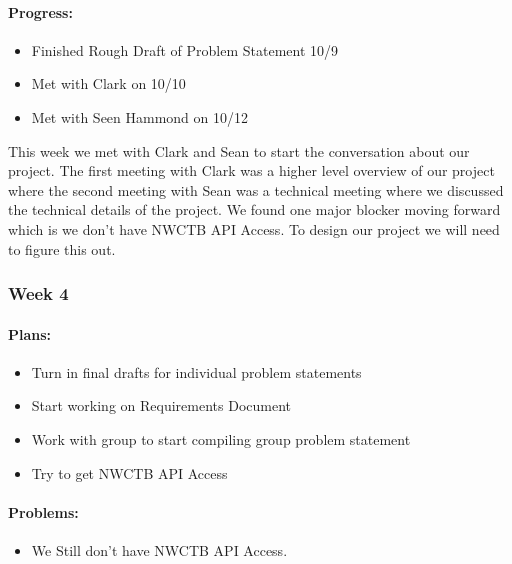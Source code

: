 \documentclass[onecolumn, draftclsnofoot,10pt, compsoc]{article}
\begin{document}
		    \paragraph{Progress:} \hfill \break

		    \begin{itemize}
		        \item Finished Rough Draft of Problem Statement 10/9
		        \item Met with Clark on 10/10
		        \item Met with Seen Hammond on 10/12
		    \end{itemize}
		    
		     \hfill \break
		    	This week we met with Clark and Sean to start the conversation about our project. The first meeting with Clark was a higher level overview of our project where the second meeting with Sean was a technical meeting where we discussed the technical details of the project. We found one major blocker moving forward which is we don't have NWCTB API Access. To design our project we will need to figure this out.\\ 
		        
		\subsubsection{Week 4}
		
		    \paragraph{Plans:} \hfill \break
		        
		        \begin{itemize}
		            \item Turn in final drafts for individual problem statements
		            \item Start working on Requirements Document
		            \item Work with group to start compiling group problem statement
		            \item Try to get NWCTB API Access
		        \end{itemize}
		        
		    \paragraph{Problems:} \hfill \break
		        
		        \begin{itemize}
		            \item We Still don't have NWCTB API Access.
		        \end{itemize}
		        
\end{document}
